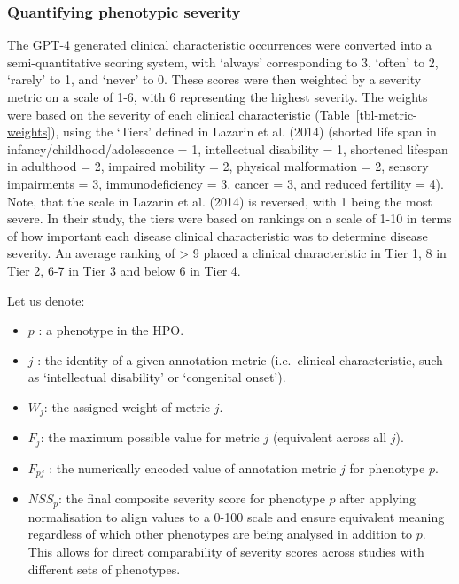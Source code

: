 \documentclass[
]{agujournal2019}
\begin{document}
\subsubsection{Quantifying phenotypic
severity}\label{quantifying-phenotypic-severity-1}

The GPT-4 generated clinical characteristic occurrences were converted
into a semi-quantitative scoring system, with `always' corresponding to
3, `often' to 2, `rarely' to 1, and `never' to 0. These scores were then
weighted by a severity metric on a scale of 1-6, with 6 representing the
highest severity. The weights were based on the severity of each
clinical characteristic (Table~\ref{tbl-metric-weights}), using the
`Tiers' defined in Lazarin et al. (2014) (shorted life span in
infancy/childhood/adolescence = 1, intellectual disability = 1,
shortened lifespan in adulthood = 2, impaired mobility = 2, physical
malformation = 2, sensory impairments = 3, immunodeficiency = 3, cancer
= 3, and reduced fertility = 4). Note, that the scale in Lazarin et al.
(2014) is reversed, with 1 being the most severe. In their study, the
tiers were based on rankings on a scale of 1-10 in terms of how
important each disease clinical characteristic was to determine disease
severity. An average ranking of \textgreater{} 9 placed a clinical
characteristic in Tier 1, 8 in Tier 2, 6-7 in Tier 3 and below 6 in Tier
4.

Let us denote:

\begin{itemize}
\item
  \(p\) : a phenotype in the HPO.
\item
  \(j\) : the identity of a given annotation metric (i.e.~clinical
  characteristic, such as `intellectual disability' or `congenital
  onset').
\item
  \(W_j\): the assigned weight of metric \(j\).
\item
  \(F_j\): the maximum possible value for metric \(j\) (equivalent
  across all \(j\)).
\item
  \(F_{pj}\) : the numerically encoded value of annotation metric \(j\)
  for phenotype \(p\).
\item
  \(NSS_p\): the final composite severity score for phenotype \(p\)
  after applying normalisation to align values to a 0-100 scale and
  ensure equivalent meaning regardless of which other phenotypes are
  being analysed in addition to \(p\). This allows for direct
  comparability of severity scores across studies with different sets of
  phenotypes.
\end{itemize}
\end{document}
